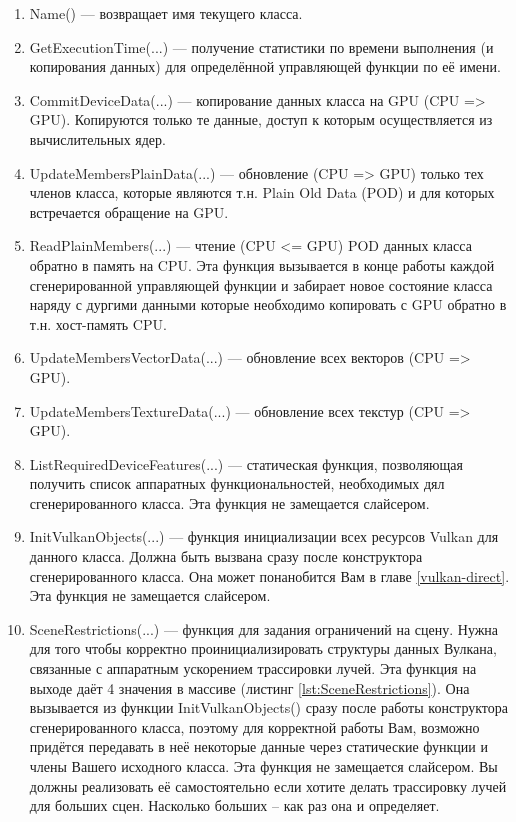 \documentclass[11pt,fleqn,english,russian]{report} %
\begin{document}
\begin{enumerate}
	\item Name() --- возвращает имя текущего класса. 
	
	\item GetExecutionTime(...) --- получение статистики по времени выполнения (и копирования данных) для определённой управляющей функции по её имени.
	\item CommitDeviceData(...) --- копирование данных класса на GPU (CPU => GPU). Копируются только те данные, доступ к которым осуществляется из вычислительных ядер. 
	
	\item UpdateMembersPlainData(...) --- обновление (CPU => GPU) только тех членов класса, которые являются т.н. Plain Old Data (POD) и для которых встречается обращение на GPU.
	
	\item ReadPlainMembers(...) --- чтение (CPU <= GPU) POD данных класса обратно в память на CPU. Эта функция вызывается в конце работы каждой сгенерированной управляющей функции и забирает новое состояние класса наряду с дургими данными которые необходимо копировать с GPU обратно в т.н. хост-память CPU.
	
	\item UpdateMembersVectorData(...) --- обновление всех векторов (CPU => GPU).
	
    \item UpdateMembersTextureData(...) --- обновление всех текстур (CPU => GPU).
    
    \item ListRequiredDeviceFeatures(...) --- статическая функция, позволяющая получить список аппаратных функциональностей, необходимых дял сгенерированного класса. Эта функция не замещается слайсером.
    
    \item InitVulkanObjects(...) --- функция инициализации всех ресурсов Vulkan для данного класса. Должна быть вызвана сразу после конструктора сгенерированного класса. Она может понанобится Вам в главе \ref{vulkan-direct}. Эта функция не замещается слайсером.
    
    \item SceneRestrictions(...) --- функция для задания ограничений на сцену. Нужна для того чтобы корректно проинициализировать структуры данных Вулкана, связанные с аппаратным ускорением трассировки лучей. Эта функция на выходе даёт 4 значения в массиве (листинг \ref{lst:SceneRestrictions}). Она вызывается из функции InitVulkanObjects() сразу после работы конструктора сгенерированного класса, поэтому для корректной работы Вам, возможно придётся передавать в неё некоторые данные через статические функции и члены Вашего исходного класса. Эта функция не замещается слайсером. Вы должны реализовать её самостоятельно если хотите делать трассировку лучей для больших сцен. Насколько больших -- как раз она и определяет.
     
\end{enumerate}
\end{document}
